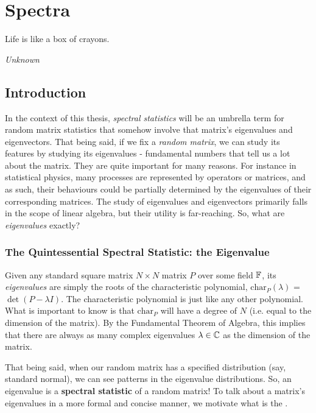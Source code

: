 
\chapter{Spectra}

\epigraph{Life is like a box of crayons.}{\textit{Unknown}}

\section{Introduction}

In the context of this thesis, \textit{spectral statistics} will be an umbrella term for random matrix statistics that somehow involve that matrix's eigenvalues and eigenvectors.
That being said, if we fix a \textit{random matrix}, we can study its features by studying its eigenvalues - fundamental numbers that tell us a lot about the matrix.
They are quite important for many reasons.
For instance in statistical physics, many processes are represented by operators or matrices, and as such, their behaviours could be partially determined by the eigenvalues of their corresponding matrices.
The study of eigenvalues and eigenvectors primarily falls in the scope of linear algebra, but their utility is far-reaching. So, what are \textit{eigenvalues} exactly?


\subsection{The Quintessential Spectral Statistic: the Eigenvalue}
Given any standard square matrix $N \times N$ matrix $P$ over some field $\mathbb{F}$,
its \textit{eigenvalues} are simply the roots of the characteristic polynomial, $\text{char}_P{(\lambda)}$ = $\det(P - \lambda I)$.
The characteristic polynomial is just like any other polynomial. What is important to know is that $\text{char}_P$ will have a degree of $N$ (i.e. equal to the dimension of the matrix).
By the Fundamental Theorem of Algebra, this implies that there are always as many complex eigenvalues $\lambda \in \mathbb{C}$ as the dimension of the matrix.

That being said, when our random matrix has a specified distribution (say, standard normal), we can see patterns in the eigenvalue distributions.
So, an eigenvalue is a \textbf{spectral statistic} of a random matrix! To talk about a matrix's eigenvalues in a more formal and concise manner, we motivate what is the .

